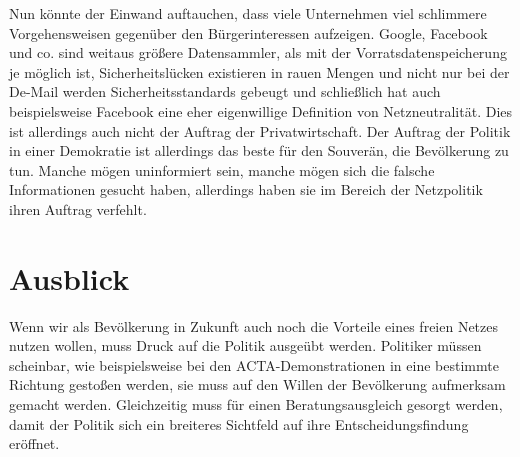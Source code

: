 \documentclass[
	12pt,
	a4paper,
	BCOR10mm,
	DIV14,
	listof=totoc,
	bibliography=totoc,
	headsepline
]{scrreprt}
\begin{document}
Nun könnte der Einwand auftauchen, dass viele Unternehmen viel schlimmere Vorgehensweisen gegenüber den Bürgerinteressen aufzeigen.
Google, Facebook und co. sind weitaus größere Datensammler, als mit der Vorratsdatenspeicherung je möglich ist, Sicherheitslücken existieren in rauen Mengen und nicht nur bei der De-Mail werden Sicherheitsstandards gebeugt und schließlich hat auch beispielsweise Facebook eine eher eigenwillige Definition von Netzneutralität. 
Dies ist allerdings auch nicht der Auftrag der Privatwirtschaft.
Der Auftrag der Politik in einer Demokratie ist allerdings das beste für den Souverän, die Bevölkerung zu tun.
Manche mögen uninformiert sein, manche mögen sich die falsche Informationen gesucht haben, allerdings haben sie im Bereich der Netzpolitik ihren Auftrag verfehlt.


\section{Ausblick}
\label{lookout}
Wenn wir als Bevölkerung in Zukunft auch noch die Vorteile eines freien Netzes nutzen wollen, muss Druck auf die Politik ausgeübt werden.
Politiker müssen scheinbar, wie beispielsweise bei den ACTA-Demonstrationen in eine bestimmte Richtung gestoßen werden, sie muss auf den Willen der Bevölkerung aufmerksam gemacht werden.
Gleichzeitig muss für einen Beratungsausgleich gesorgt werden, damit der Politik sich ein breiteres Sichtfeld auf ihre Entscheidungsfindung eröffnet.


\nocite{*}




\end{document}
